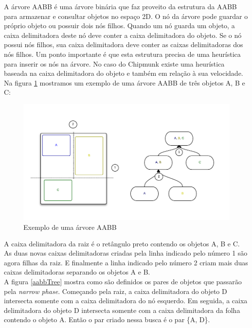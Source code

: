A árvore AABB é uma árvore binária que faz proveito da estrutura da AABB para armazenar e consultar objetos no espaço 2D. O nó da árvore pode guardar o próprio objeto 
ou possuir dois nós filhos. Quando um nó guarda um objeto, a caixa delimitadora deste nó deve conter a caixa delimitadora do objeto. Se o nó possui nós filhos, 
sua caixa delimitadora deve conter as caixas delimitadoras dos nós filhos. 
Um ponto importante é que esta estrutura precisa de uma heurística para inserir os nós na árvore. No caso do Chipmunk existe uma heurística baseada na caixa 
delimitadora do objeto e também em relação à sua velocidade. Na figura \ref{aabb} mostramos um exemplo de uma árvore AABB de três objetos A, B e C: 

\begin{figure}[!htbp]
  \includegraphics[scale=0.4]{AABBTree.png}
  \caption{Exemplo de uma árvore AABB}
  \label{aabb}
\end{figure}

A caixa delimitadora da raiz é o retângulo preto contendo os objetos A, B e C.
As duas novas caixas delimitadoras criadas pela linha indicado pelo número 1 são agora filhas da raiz. 
E finalmente a linha indicado pelo número 2 criam mais duas caixas delimitadoras separando os objetos A e B.\\

A figura \ref{aabbTree} mostra como são definidos os pares de objetos que passarão pela \textit{narrow phase}. Começando pela raiz, a caixa delimitadora do objeto D intersecta somente 
com a caixa delimitadora do nó esquerdo. Em seguida, a caixa delimitadora do objeto D intersecta somente com a caixa delimitadora da folha contendo o objeto A.
Então o par criado nessa busca é o par \{A, D\}.

